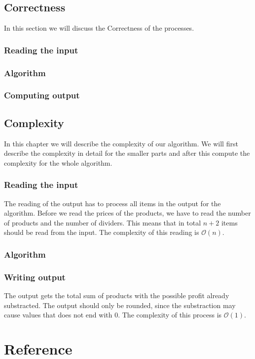 \documentclass{article}
\newcommand{\bigO}[1]{\mathcal{O}(#1)}
\begin{document}
\subsection{Correctness}
In this section we will discuss the Correctness of the processes.

\subsubsection{Reading the input}

\subsubsection{Algorithm}

\subsubsection{Computing output}

\subsection{Complexity}
In this chapter we will describe the complexity of our algorithm. We will first describe the complexity in detail for the smaller parts and after this compute the complexity for the whole algorithm.

\subsubsection{Reading the input}
The reading of the output has to process all items in the output for the algorithm. Before we read the prices of the products, we have to read the number of products and the number of dividers. This means that in total $n + 2$ items should be read from the input. The complexity of this reading is $\bigO{n}$.

\subsubsection{Algorithm}

\subsubsection{Writing output}
The output gets the total sum of products with the possible profit already substracted. The output should only be rounded, since the substraction may cause values that does not end with 0. The complexity of this process is $\bigO{1}$.

\newpage
\section{Reference}
\end{document}
